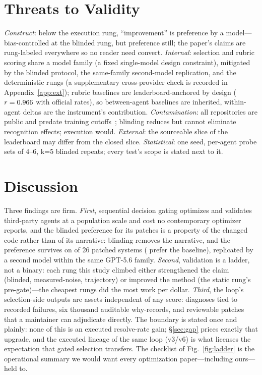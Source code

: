 \documentclass[11pt]{article}
\begin{document}
\section{Threats to Validity}
\label{sec:threats}
\emph{Construct}: below the execution rung, ``improvement'' is preference by
a model---bias-controlled at the blinded rung, but preference still; the
paper's claims are rung-labeled everywhere so no reader need convert.
\emph{Internal}: selection and rubric scoring share a model family (a fixed
single-model design constraint), mitigated by the blinded protocol, the
same-family second-model replication, and the deterministic rungs (a
supplementary cross-provider check is recorded in Appendix~\ref{app:ext});
rubric baselines are
leaderboard-anchored by design ($r=0.966$ with official rates), so
between-agent baselines are inherited, within-agent deltas are the
instrument's contribution. \emph{Contamination}: all repositories are public
and predate training cutoffs~\citep{contamination2023}; blinding reduces but
cannot eliminate recognition effects; execution would. \emph{External}: the
sourceable slice of the leaderboard may differ from the closed slice.
\emph{Statistical}: one seed, per-agent probe sets of 4--6, k=5 blinded
repeats; every test's scope is stated next to it.

\section{Discussion}
\label{sec:discussion}
Three findings are firm. \emph{First}, sequential decision gating optimizes
and validates third-party agents at a population scale and cost no
contemporary optimizer reports,
and the blinded preference for its patches is a property of the changed
code rather than of its narrative: blinding removes the
narrative, and the preference survives on \swBlindMajP{} of 26 patched systems
(\swBlindMajB{} prefer the baseline), replicated by a second
model within the same GPT-5.6 family. \emph{Second}, validation is a ladder, not a binary:
each rung this study climbed either strengthened the claim (blinded,
measured-noise, trajectory) or improved the method (the static rung's
pre-gate)---the cheapest rungs did the most work per dollar. \emph{Third},
the loop's selection-side outputs are assets independent of any score:
diagnoses tied to recorded failures, six thousand auditable why-records, and
\swApplied{} reviewable patches that a maintainer can adjudicate directly.
The boundary is stated once and plainly: none of this is an executed
resolve-rate gain; \S\ref{sec:gap} prices exactly that upgrade, and the
executed lineage of the same loop (v3/v6) is what licenses the expectation
that gated selection transfers. The checklist of Fig.~\ref{fig:ladder} is the
operational summary we would want every optimization paper---including
ours---held to.
\end{document}
